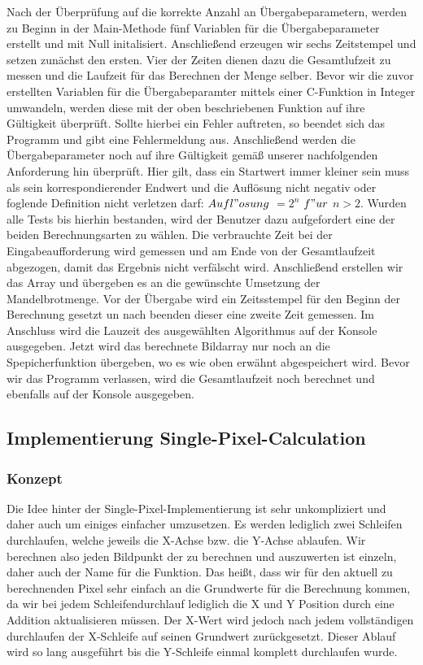\documentclass[11pt]{scrartcl}
\begin{document}
Nach der Überprüfung auf die korrekte Anzahl an Übergabeparametern, werden zu Beginn in der Main-Methode fünf Variablen für die Übergabeparameter erstellt und mit Null initalisiert.
Anschließend erzeugen wir sechs Zeitstempel und setzen zunächst den ersten.
Vier der Zeiten dienen dazu die Gesamtlufzeit zu messen und die Laufzeit für das Berechnen der Menge selber.
Bevor wir die zuvor erstellten Variablen für die Übergabeparamter mittels einer C-Funktion in Integer umwandeln, werden diese mit der oben beschriebenen Funktion auf ihre Gültigkeit überprüft.
Sollte hierbei ein Fehler auftreten, so beendet sich das Programm und gibt eine Fehlermeldung aus.
Anschließend werden die Übergabeparameter noch auf ihre Gültigkeit gemäß unserer nachfolgenden Anforderung hin überprüft.
Hier gilt, dass ein Startwert immer kleiner sein muss als sein korrespondierender Endwert und die Auflösung nicht negativ oder foglende Definition nicht verletzen darf: $Aufl"osung$ $= 2^n$ $f"ur$ $n>2$.
Wurden alle Tests bis hierhin bestanden, wird der Benutzer dazu aufgefordert eine der beiden Berechnungsarten zu wählen.
Die verbrauchte Zeit bei der Eingabeaufforderung wird gemessen und am Ende von der Gesamtlaufzeit abgezogen, damit das Ergebnis nicht verfälscht wird.
Anschließend erstellen wir das Array und übergeben es an die gewünschte Umsetzung der Mandelbrotmenge.
Vor der Übergabe wird ein Zeitsstempel für den Beginn der Berechnung gesetzt un nach beenden dieser eine zweite Zeit gemessen.
Im Anschluss wird die Lauzeit des ausgewählten Algorithmus auf der Konsole ausgegeben.
Jetzt wird das berechnete Bildarray nur noch an die Spepicherfunktion übergeben, wo es wie oben erwähnt abgespeichert wird.
Bevor wir das Programm verlassen, wird die Gesamtlaufzeit noch berechnet und ebenfalls auf der Konsole ausgegeben.

\subsection{Implementierung Single-Pixel-Calculation}

\subsubsection{Konzept}

Die Idee hinter der Single-Pixel-Implementierung ist sehr unkompliziert und daher auch um einiges einfacher umzusetzen.
Es werden lediglich zwei Schleifen durchlaufen, welche jeweils die X-Achse bzw. die Y-Achse ablaufen. Wir berechnen also jeden Bildpunkt der zu berechnen und auszuwerten ist einzeln, daher auch der Name für die Funktion.
Das heißt, dass wir für den aktuell zu berechnenden Pixel sehr einfach an die Grundwerte für die Berechnung kommen, da wir bei jedem Schleifendurchlauf lediglich die X und Y Position durch eine Addition aktualisieren müssen.
Der X-Wert wird jedoch nach jedem vollständigen durchlaufen der X-Schleife auf seinen Grundwert zurückgesetzt.
Dieser Ablauf wird so lang ausgeführt bis die Y-Schleife einmal komplett durchlaufen wurde.
\end{document}
